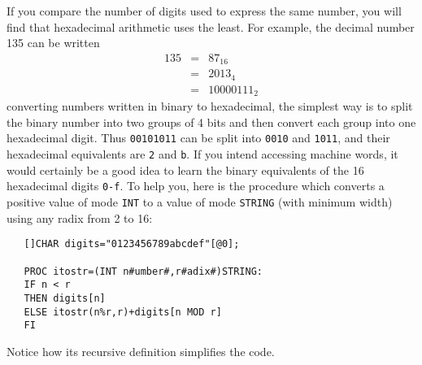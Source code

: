 If you compare the number of digits used to express the same number,
you will find that hexadecimal arithmetic uses the least. For
example, the decimal number 135 can be written
\begin{eqnarray*}
    135&=&87_{16}\\
       &=&2013_4\\
       &=&10000111_2
\end{eqnarray*}
 converting numbers written in binary to
hexadecimal, the simplest way is to split the binary number into two
groups of 4 bits and then convert each group into one hexadecimal
digit.  Thus \verb|00101011| can be split into \verb|0010| and
\verb|1011|, and their hexadecimal equivalents are \verb|2| and
\verb|b|.  If you intend accessing machine words, it would certainly be
a good idea to learn the binary equivalents of the 16 hexadecimal
digits \verb|0-f|.  To help you, here is the procedure
 which converts a positive value of
mode \verb|INT| to a value of mode \verb|STRING| (with minimum width)
using any radix from 2 to 16:
\begin{verbatim}
   []CHAR digits="0123456789abcdef"[@0];
   
   PROC itostr=(INT n#umber#,r#adix#)STRING:
   IF n < r
   THEN digits[n]
   ELSE itostr(n%r,r)+digits[n MOD r]
   FI
\end{verbatim}
\noindent
Notice how its recursive definition simplifies the code.
\newpage

